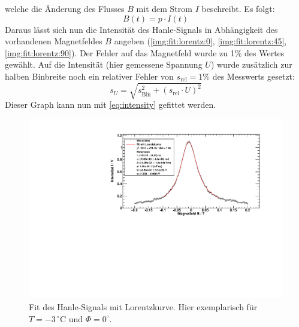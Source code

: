 welche die Änderung des Flusses $B$ mit dem Strom $I$ beschreibt. 
Es folgt:
\begin{equation}
  B(t) = p \cdot I(t)
\end{equation}
Daraus lässt sich nun die Intensität des Hanle-Signals in Abhängigkeit des vorhandenen Magnetfeldes $B$ angeben (\autoref{img:fit:lorentz:0}, 
\autoref{img:fit:lorentz:45}, \autoref{img:fit:lorentz:90}).
Der Fehler auf das Magnetfeld wurde zu 1\% des Wertes gewählt. Auf die Intensität (hier gemessene Spannung $U$) wurde zusätzlich zur halben Binbreite 
noch ein relativer Fehler von $s_\text{rel} = 1\%$ des Messwerts gesetzt:
\begin{equation}
  s_U = \sqrt{s_{\text{Bin}}^2 + (s_\text{rel} \cdot U)^2}
\end{equation}
Dieser Graph kann nun mit \autoref{eq:intensity} gefittet werden.
\begin{figure}[H]
\begin{center}
  \includegraphics[width=\textwidth]{../img/fit_00_m03.pdf}
  \caption{Fit des Hanle-Signals mit Lorentzkurve. Hier exemplarisch für $T=-3\,{}^\circ$C und $\Phi=0^\circ$.}
  \label{img:fit:lorentz:0}
\end{center}
\end{figure}
